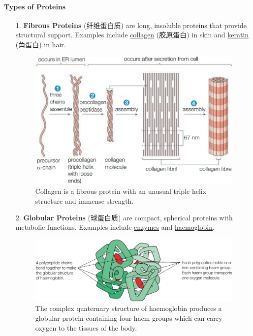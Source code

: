 \paragraph{Types of Proteins}
\begin{itemize}
    \item[1.] \textbf{Fibrous Proteins} (纤维蛋白质) are long, insoluble proteins that provide structural support. Examples include
    \underline{collagen} (胶原蛋白) in skin and \underline{keratin} (角蛋白) in hair.
    \begin{figure}[H]
        \centering
        \includegraphics[scale=0.3]{Biology/1A/Images/1A-5-5.png}
        \caption{Collagen is a fibrous protein with an unusual triple helix structure and immense strength.}
    \end{figure}
    \item[2.] \textbf{Globular Proteins} (球蛋白质) are compact, spherical proteins with metabolic functions. Examples include
    \underline{enzymes} and \underline{haemoglobin}.
    \begin{figure}[H]
        \centering
        \includegraphics[scale=0.3]{Biology/1A/Images/1A-5-6.png}
        \caption{The complex quaternary structure of haemoglobin produces a globular protein containing four haem groups which
        can carry oxygen to the tissues of the body.}
    \end{figure}
\end{itemize}

